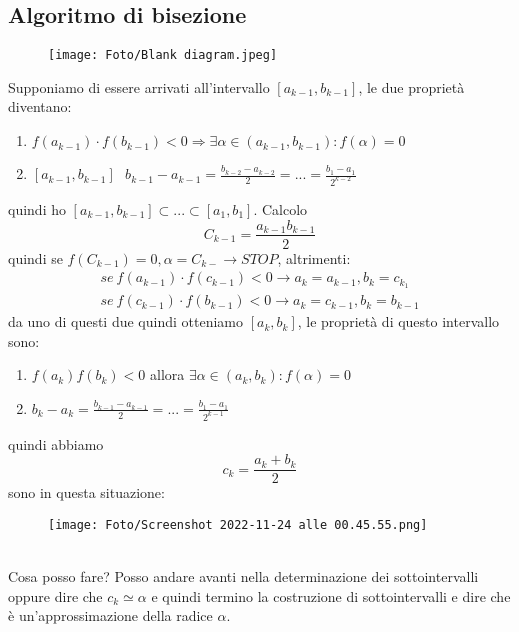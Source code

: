\documentclass[a4paper, portrait]{book}
\numberwithin{equation}{chapter} %
\begin{document}
\subsection*{Algoritmo di bisezione}
\begin{figure}[h!]
    \centering
    \texttt{[image: Foto/Blank diagram.jpeg]}
    \caption{}
\end{figure}
Supponiamo di essere arrivati all'intervallo $[a_{k-1},b_{k-1}]$, le due proprietà diventano:
\begin{enumerate}
    \item $f(a_{k-1})\cdot f(b_{k-1}) < 0 \Rightarrow \exists \alpha \in (a_{k-1},b_{k-1}): f(\alpha) = 0$
    \item $[a_{k-1},b_{k-1}] \ \ \ b_{k-1}-a_{k-1} = \frac{b_{k-2}-a_{k-2}}{2} = ... = \frac{b_1 - a_1}{2^{k-2}}$
\end{enumerate}
quindi ho $[a_{k-1},b_{k-1}] \subset ... \subset [a_1,b_1]$. Calcolo 
\begin{equation}
    C_{k-1} = \frac{a_{k-1}b_{k-1}}{2}
\end{equation}
quindi se $f(C_{k-1}) = 0, \alpha = C_{k-} \rightarrow STOP$, altrimenti:
\begin{gather}
    se \ f(a_{k-1})\cdot f(c_{k-1}) < 0 \rightarrow a_k = a_{k-1}, b_k = c_{k_1}\\
    se \ f(c_{k-1})\cdot f(b_{k-1}) < 0 \rightarrow a_k = c_{k-1}, b_k = b_{k-1}
\end{gather}
da uno di questi due quindi otteniamo $[a_k, b_k]$, le proprietà di questo intervallo sono:
\begin{enumerate}
    \item $f(a_k)f(b_k) < 0$ allora $\exists \alpha \in (a_k,b_k): f(\alpha) = 0$
    \item $b_k - a_k = \frac{b_{k-1}-a_{k-1}}{2} = ... = \frac{b_1-a_1}{2^{k-1}}$
\end{enumerate}
quindi abbiamo
\begin{equation}
    c_k = \frac{a_k+b_k}{2}
\end{equation}
sono in questa situazione:
\begin{figure}[h!]
    \centering
    \texttt{[image: Foto/Screenshot 2022-11-24 alle 00.45.55.png]}
    \caption{}
\end{figure}
\\Cosa posso fare? Posso andare avanti nella determinazione dei sottointervalli oppure dire che $c_k \simeq \alpha$ e quindi termino la costruzione di sottointervalli e dire che è un'approssimazione della radice $\alpha$.\\
\end{document}
